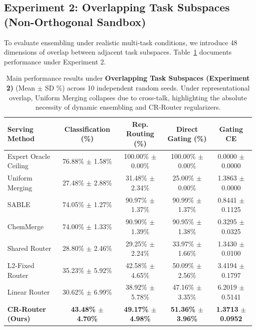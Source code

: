 \subsection{Experiment 2: Overlapping Task Subspaces (Non-Orthogonal Sandbox)}
To evaluate ensembling under realistic multi-task conditions, we introduce 48 dimensions of overlap between adjacent task subspaces. Table~\ref{tab:overlapping_results} documents performance under Experiment 2.

\begin{table}[t]
\centering
\small
\setlength{\tabcolsep}{2.5pt}
\caption{Main performance results under \textbf{Overlapping Task Subspaces (Experiment 2)} (Mean $\pm$ SD \%) across 10 independent random seeds. Under representational overlap, Uniform Merging collapses due to cross-talk, highlighting the absolute necessity of dynamic ensembling and CR-Router regularizers.}
\vskip 0.15in
\label{tab:overlapping_results}
\begin{tabular*}{\textwidth}{@{\extracolsep{\fill}}lcccc}
\toprule
\textbf{Serving Method} & \textbf{Classification (\%)} & \textbf{Rep. Routing (\%)} & \textbf{Direct Gating (\%)} & \textbf{Gating CE} \\
\midrule
Expert Oracle Ceiling & 76.88\% $\pm$ 1.58\% & 100.00\% $\pm$ 0.00\% & 100.00\% $\pm$ 0.00\% & 0.0000 $\pm$ 0.0000 \\
Uniform Merging & 27.48\% $\pm$ 2.88\% & 31.48\% $\pm$ 2.34\% & 25.00\% $\pm$ 0.00\% & 1.3863 $\pm$ 0.0000 \\
SABLE \cite{sable2025samplewise} & 74.05\% $\pm$ 1.27\% & 90.97\% $\pm$ 1.37\% & 90.99\% $\pm$ 1.37\% & 0.8441 $\pm$ 0.1125 \\
ChemMerge \cite{chemmerge2025kinetics} & 74.00\% $\pm$ 1.33\% & 90.90\% $\pm$ 1.39\% & 90.95\% $\pm$ 1.38\% & 0.3295 $\pm$ 0.0325 \\
Shared Router & 28.80\% $\pm$ 2.46\% & 29.25\% $\pm$ 2.24\% & 33.97\% $\pm$ 1.66\% & 1.3430 $\pm$ 0.0100 \\
L2-Fixed Router & 35.23\% $\pm$ 5.92\% & 42.58\% $\pm$ 4.65\% & 50.09\% $\pm$ 2.56\% & 3.4194 $\pm$ 0.1797 \\
Linear Router & 30.62\% $\pm$ 6.99\% & 38.92\% $\pm$ 5.78\% & 47.16\% $\pm$ 3.35\% & 6.2019 $\pm$ 0.5141 \\
\midrule
\textbf{CR-Router (Ours)} & \textbf{43.48\% $\pm$ 4.70\%} & \textbf{49.17\% $\pm$ 4.98\%} & \textbf{51.36\% $\pm$ 3.96\%} & \textbf{1.3713} $\pm$ \textbf{0.0952} \\
\bottomrule
\end{tabular*}
\end{table}


